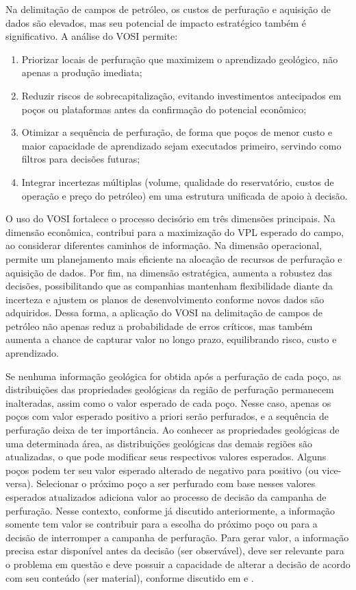 Na delimitação de campos de petróleo, os custos de perfuração e aquisição de dados são elevados, mas seu potencial de impacto estratégico também é significativo. A análise do VOSI permite:
\begin{enumerate}
    \item[\textbullet] Priorizar locais de perfuração que maximizem o aprendizado geológico, não apenas a produção imediata;
    \item[\textbullet] Reduzir riscos de sobrecapitalização, evitando investimentos antecipados em poços ou plataformas antes da confirmação do potencial econômico;
    \item[\textbullet] Otimizar a sequência de perfuração, de forma que poços de menor custo e maior capacidade de aprendizado sejam executados primeiro, servindo como filtros para decisões futuras;
    \item[\textbullet] Integrar incertezas múltiplas (volume, qualidade do reservatório, custos de operação e preço do petróleo) em uma estrutura unificada de apoio à decisão.
\end{enumerate}

O uso do VOSI fortalece o processo decisório em três dimensões principais. Na dimensão econômica, contribui para a maximização do VPL esperado do campo, ao considerar diferentes caminhos de informação. Na dimensão operacional, permite um planejamento mais eficiente na alocação de recursos de perfuração e aquisição de dados. Por fim, na dimensão estratégica, aumenta a robustez das decisões, possibilitando que as companhias mantenham flexibilidade diante da incerteza e ajustem os planos de desenvolvimento conforme novos dados são adquiridos. Dessa forma, a aplicação do VOSI na delimitação de campos de petróleo não apenas reduz a probabilidade de erros críticos, mas também aumenta a chance de capturar valor no longo prazo, equilibrando risco, custo e aprendizado.

Se nenhuma informação geológica for obtida após a perfuração de cada poço, as distribuições das propriedades geológicas da região de perfuração permanecem inalteradas, assim como o valor esperado de cada poço. Nesse caso, apenas os poços com valor esperado positivo a priori serão perfurados, e a sequência de perfuração deixa de ter importância. Ao conhecer as propriedades geológicas de uma determinada área, as distribuições geológicas das demais regiões são atualizadas, o que pode modificar seus respectivos valores esperados. Alguns poços podem ter seu valor esperado alterado de negativo para positivo (ou vice-versa). Selecionar o próximo poço a ser perfurado com base nesses valores esperados atualizados adiciona valor ao processo de decisão da campanha de perfuração. Nesse contexto, conforme já discutido anteriormente, a informação somente tem valor se contribuir para a escolha do próximo poço ou para a decisão de interromper a campanha de perfuração. Para gerar valor, a informação precisa estar disponível antes da decisão (ser observável), deve ser relevante para o problema em questão e deve possuir a capacidade de alterar a decisão de acordo com seu conteúdo (ser material), conforme discutido em \cite{01} e \cite{03}.

